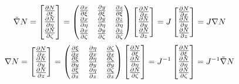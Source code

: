 \documentclass[11pt]{article}
\newcommand{\xxi}{\frac{\partial x}{\partial \xi}}
\newcommand{\yxi}{\frac{\partial y}{\partial \xi}}
\newcommand{\zxi}{\frac{\partial z}{\partial \xi}}
\newcommand{\xeta}{\frac{\partial x}{\partial \eta}}
\newcommand{\yeta}{\frac{\partial y}{\partial \eta}}
\newcommand{\zeeta}{\frac{\partial z}{\partial \eta}}
\newcommand{\xzeta}{\frac{\partial x}{\partial \zeta}}
\newcommand{\yzeta}{\frac{\partial y}{\partial \zeta}}
\newcommand{\zzeta}{\frac{\partial z}{\partial \zeta}}
\newcommand{\xix}{\frac{\partial \xi}{\partial x}}
\newcommand{\xiy}{\frac{\partial \xi}{\partial y}}
\newcommand{\xiz}{\frac{\partial \xi}{\partial z}}
\newcommand{\etax}{\frac{\partial \eta}{\partial x}}
\newcommand{\etay}{\frac{\partial \eta}{\partial y}}
\newcommand{\etaz}{\frac{\partial \eta}{\partial z}}
\newcommand{\zetax}{\frac{\partial \zeta}{\partial x}}
\newcommand{\zetay}{\frac{\partial \zeta}{\partial y}}
\newcommand{\zetaz}{\frac{\partial \zeta}{\partial z}}
\newcommand{\nx}{\frac{\partial N}{\partial x}}
\newcommand{\ny}{\frac{\partial N}{\partial y}}
\newcommand{\nz}{\frac{\partial N}{\partial z}}
\newcommand{\nxi}{\frac{\partial N}{\partial \xi}}
\newcommand{\neta}{\frac{\partial N}{\partial \eta}}
\newcommand{\nzeta}{\frac{\partial N}{\partial \zeta}}
\begin{document}
\begin{enumerate}
    \begin{equation*}
    \tilde{\nabla} N =
    \left[
    \begin{array}{@{}c@{}}
    \nxi\\
    \neta\\
    \nzeta
    \end{array}
    \right] =
    \begin{pmatrix}
    \xxi & \yxi  & \zxi   \\
    \xeta & \yeta & \zeeta   \\
    \xzeta & \yzeta & \zzeta
    \end{pmatrix}
    \left[
    \begin{array}{@{}c@{}}
    \nx\\
    \ny\\
    \nz
    \end{array}
    \right] =
    J \left[
    \begin{array}{@{}c@{}}
    \nx\\
    \ny\\
    \nz
    \end{array}
    \right] = J \nabla N
    \end{equation*}
    \begin{equation*}
    \nabla N =
    \left[
    \begin{array}{@{}c@{}}
    \nx\\
    \ny\\
    \nz
    \end{array}
    \right] =
    \begin{pmatrix}
    \xix & \etax  & \zetax   \\
    \xiy & \etay & \zetay   \\
    \xiz & \etaz & \zetaz
    \end{pmatrix}
    \left[
    \begin{array}{@{}c@{}}
    \nxi\\
    \neta\\
    \nzeta
    \end{array}
    \right] =
    J^{-1}
    \left[
    \begin{array}{@{}c@{}}
    \nxi\\
    \neta\\
    \nzeta
    \end{array}
    \right] = J^{-1} \tilde{\nabla}N
    \end{equation*}


\end{enumerate}
\end{document}

